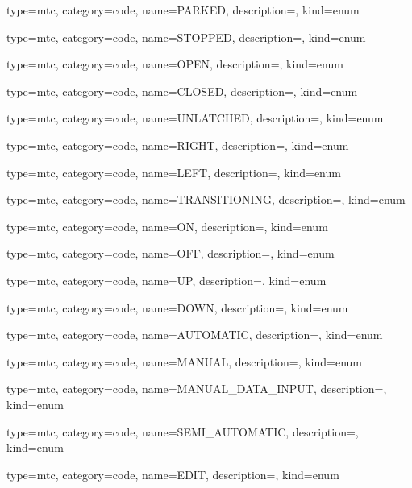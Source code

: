 {
  type=mtc,
  category=code,
  name={PARKED},
  description={},
  kind={enum}
}


{
  type=mtc,
  category=code,
  name={STOPPED},
  description={},
  kind={enum}
}


{
  type=mtc,
  category=code,
  name={OPEN},
  description={},
  kind={enum}
}


{
  type=mtc,
  category=code,
  name={CLOSED},
  description={},
  kind={enum}
}


{
  type=mtc,
  category=code,
  name={UNLATCHED},
  description={},
  kind={enum}
}


{
  type=mtc,
  category=code,
  name={RIGHT},
  description={},
  kind={enum}
}


{
  type=mtc,
  category=code,
  name={LEFT},
  description={},
  kind={enum}
}


{
  type=mtc,
  category=code,
  name={TRANSITIONING},
  description={},
  kind={enum}
}


{
  type=mtc,
  category=code,
  name={ON},
  description={},
  kind={enum}
}


{
  type=mtc,
  category=code,
  name={OFF},
  description={},
  kind={enum}
}


{
  type=mtc,
  category=code,
  name={UP},
  description={},
  kind={enum}
}


{
  type=mtc,
  category=code,
  name={DOWN},
  description={},
  kind={enum}
}


{
  type=mtc,
  category=code,
  name={AUTOMATIC},
  description={},
  kind={enum}
}


{
  type=mtc,
  category=code,
  name={MANUAL},
  description={},
  kind={enum}
}


{
  type=mtc,
  category=code,
  name={MANUAL\_DATA\_INPUT},
  description={},
  kind={enum}
}


{
  type=mtc,
  category=code,
  name={SEMI\_AUTOMATIC},
  description={},
  kind={enum}
}


{
  type=mtc,
  category=code,
  name={EDIT},
  description={},
  kind={enum}
}


